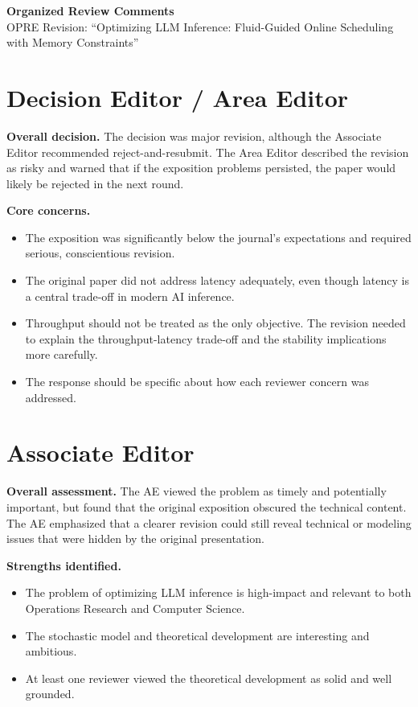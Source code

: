 \documentclass[11pt]{article}
\begin{document}
\begin{center}
{\Large \textbf{Organized Review Comments}}\\[0.35em]
{\normalsize OPRE Revision: ``Optimizing LLM Inference: Fluid-Guided Online Scheduling with Memory Constraints''}
\end{center}

\section*{Decision Editor / Area Editor}

\textbf{Overall decision.} The decision was major revision, although the Associate Editor recommended reject-and-resubmit. The Area Editor described the revision as risky and warned that if the exposition problems persisted, the paper would likely be rejected in the next round.

\textbf{Core concerns.}
\begin{itemize}
    \item The exposition was significantly below the journal's expectations and required serious, conscientious revision.
    \item The original paper did not address latency adequately, even though latency is a central trade-off in modern AI inference.
    \item Throughput should not be treated as the only objective. The revision needed to explain the throughput-latency trade-off and the stability implications more carefully.
    \item The response should be specific about how each reviewer concern was addressed.
\end{itemize}

\section*{Associate Editor}

\textbf{Overall assessment.} The AE viewed the problem as timely and potentially important, but found that the original exposition obscured the technical content. The AE emphasized that a clearer revision could still reveal technical or modeling issues that were hidden by the original presentation.

\textbf{Strengths identified.}
\begin{itemize}
    \item The problem of optimizing LLM inference is high-impact and relevant to both Operations Research and Computer Science.
    \item The stochastic model and theoretical development are interesting and ambitious.
    \item At least one reviewer viewed the theoretical development as solid and well grounded.
\end{itemize}
\end{document}
